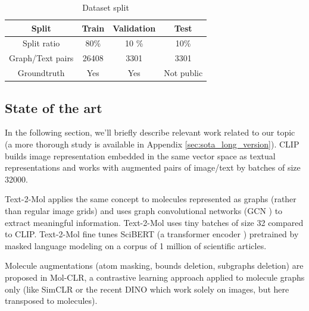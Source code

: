 \begin{table}
    \centering
    \begin{tabular}{|c|ccc|}
    \hline
         Split &  Train &  Validation& Test\\ \hline  
         Split ratio &  80\% & 10 \% & 10\% \\ \hline  
         Graph/Text pairs&  26408&  3301& 3301\\ \hline  
         Groundtruth&  Yes&  Yes& Not public\\ \hline 
    \end{tabular}
    \caption{Dataset split}
    \label{tab:dataset_stats}
\end{table}

\subsection{State of the art}
\label{sec:sota}
In the following section, we'll briefly describe relevant work related to our topic (a more thorough study is available in Appendix \ref{sec:sota_long_version}).
CLIP \cite{CLIP} builds image representation embedded in the same vector space as textual representations and works with augmented pairs of image/text by batches of size 32000. 

Text-2-Mol \cite{text2mol} applies the same concept to molecules represented as graphs (rather than regular image grids) and uses graph convolutional networks (GCN \cite{kipfwellinggcn}) to extract meaningful information. Text-2-Mol uses tiny batches of size 32 compared to CLIP. Text-2-Mol fine tunes SciBERT (a transformer encoder \cite{scibert}) pretrained by masked language modeling on a corpus of 1 million of scientific articles. 

Molecule augmentations (atom masking, bounds deletion, subgraphs deletion) are proposed in Mol-CLR\cite{molCLR}, a contrastive learning approach applied to molecule graphs only (like SimCLR \cite{SIMCLR} or the recent DINO \cite{DINO} which work solely on images, but here transposed to molecules).